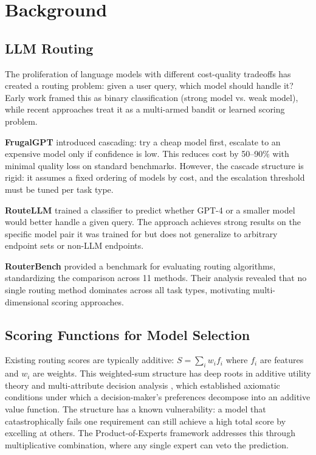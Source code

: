 \section{Background}
\label{sec:background}

\subsection{LLM Routing}

The proliferation of language models with different cost-quality tradeoffs has created a routing problem: given a user query, which model should handle it? Early work framed this as binary classification (strong model vs. weak model), while recent approaches treat it as a multi-armed bandit or learned scoring problem.

\textbf{FrugalGPT} \citep{chen2023frugalgpt} introduced cascading: try a cheap model first, escalate to an expensive model only if confidence is low. This reduces cost by 50--90\% with minimal quality loss on standard benchmarks. However, the cascade structure is rigid: it assumes a fixed ordering of models by cost, and the escalation threshold must be tuned per task type.

\textbf{RouteLLM} \citep{ong2024routellm} trained a classifier to predict whether GPT-4 or a smaller model would better handle a given query. The approach achieves strong results on the specific model pair it was trained for but does not generalize to arbitrary endpoint sets or non-LLM endpoints.

\textbf{RouterBench} \citep{hu2024routerbench} provided a benchmark for evaluating routing algorithms, standardizing the comparison across 11 methods. Their analysis revealed that no single routing method dominates across all task types, motivating multi-dimensional scoring approaches.

\subsection{Scoring Functions for Model Selection}

Existing routing scores are typically additive: $S = \sum_i w_i f_i$ where $f_i$ are features and $w_i$ are weights. This weighted-sum structure has deep roots in additive utility theory \citep{fishburn1967additive} and multi-attribute decision analysis \citep{keeney1976decisions}, which established axiomatic conditions under which a decision-maker's preferences decompose into an additive value function. The structure has a known vulnerability: a model that catastrophically fails one requirement can still achieve a high total score by excelling at others. The Product-of-Experts framework \citep{hinton2002poe} addresses this through multiplicative combination, where any single expert can veto the prediction.

